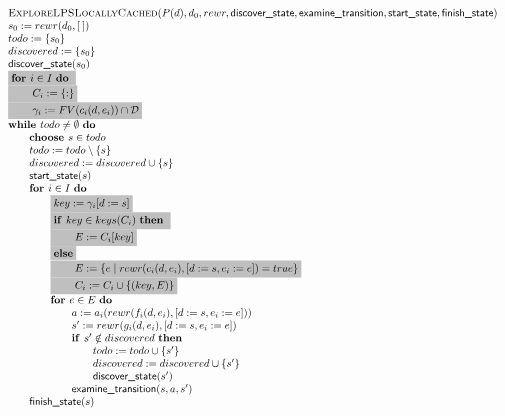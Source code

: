 \documentclass{article}
\newcommand{\emptymap}{\ensuremath{\{ : \}}}
\newcommand{\Space}{\text{\ }}
\newcommand{\If}{\text{\textbf{if }}}
\newcommand{\Do}{\text{\textbf{do }}}
\newcommand{\Then}{\text{\textbf{then }}}
\newcommand{\For}{\text{\textbf{for }}}
\newcommand{\While}{\text{\textbf{while }}}
\newcommand{\Choose}{\text{\textbf{choose }}}
\begin{document}
\[
\begin{tabular}{l}
\textsc{ExploreLPSLocallyCached}($P(d), d_0, rewr, \textsf{discover\_state}, \textsf{examine\_transition},
\textsf{start\_state}, \textsf{finish\_state})$ \\
$s_0 := rewr(d_0, [\:])$ \\
$todo := \{ s_0 \}$ \\
$discovered := \{ s_0 \}$ \\
$\textsf{discover\_state}(s_0)$ \\
\colorbox{lightgray}{\For $i \in I$ \Do} \\
\colorbox{lightgray}{\qquad $C_i := \emptymap$} \\
\colorbox{lightgray}{\qquad $\gamma_i := FV(c_i(d, e_i)) \cap \mathcal{D}$} \\
$\While todo \neq \emptyset \Space \Do$ \\
\qquad $\Choose s \in todo$ \\
\qquad $todo := todo \setminus \{s\}$ \\
\qquad $discovered := discovered \cup \{s\}$ \\
\qquad $\textsf{start\_state}(s)$ \\
\qquad $\For i \in I$ \Do \\
\qquad \qquad \colorbox{lightgray}{$key := \gamma_i[d:=s]$} \\
\qquad \qquad \colorbox{lightgray}{\If $key \in keys(C_i)$ \Then} \\
\qquad \qquad \colorbox{lightgray}{\qquad $E := C_i[key]$} \\
\qquad \qquad \colorbox{lightgray}{\textbf{else}} \\
\qquad \qquad \colorbox{lightgray}{\qquad $E := \{ e \mid rewr(c_i(d, e_i), [d:=s,e_i:=e]) = true \}$} \\
\qquad \qquad \colorbox{lightgray}{\qquad $C_i := C_i \cup \{(key, E)\}$} \\
\qquad \qquad $\For e \in E  \Space \Do$ \\
\qquad \qquad \qquad $a := a_i(rewr(f_i(d,e_i), [d:=s,e_i:=e]))$ \\
\qquad \qquad \qquad $s' := rewr(g_i(d,e_i), [d:=s,e_i:=e])$ \\
\qquad \qquad \qquad $\If s' \notin discovered \Space \Then$ \\
\qquad \qquad \qquad \qquad $todo := todo \cup \{ s' \}$ \\
\qquad \qquad \qquad \qquad $discovered := discovered \cup \{s'\}$ \\
\qquad \qquad \qquad \qquad $\textsf{discover\_state}(s')$ \\
\qquad \qquad \qquad $\textsf{examine\_transition}(s, a, s')$ \\
\qquad $\textsf{finish\_state}(s)$ \\
\end{tabular}
\]
\end{document}
